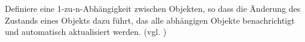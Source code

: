 \glqq Definiere eine 1-zu-n-Abhängigkeit zwischen Objekten, so dass die Änderung des Zustands eines Objekts dazu führt, das alle abhängigen Objekte benachrichtigt und automatisch aktualisiert werden. \grqq (vgl. \cite{GOF95})%